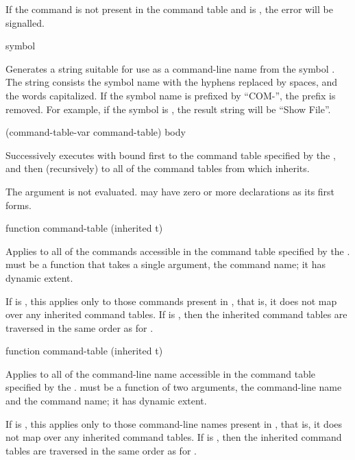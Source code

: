 If the command is not present in the command table and  is
, the  error will be signalled.

 {symbol}

Generates a string suitable for use as a command-line name from the symbol
.  The string consists the symbol name with the hyphens replaced by
spaces, and the words capitalized.  If the symbol name is prefixed by ``COM-'',
the prefix is removed.  For example, if the symbol is , the
result string will be ``Show File''.


  {(command-table-var command-table) \body body}

Successively executes  with  bound first to
the command table specified by the 
, and then (recursively) to all of the command tables from
which  inherits.

The  argument is not evaluated.   may have zero
or more declarations as its first forms.

 {function command-table \key (inherited t)}

Applies  to all of the commands accessible in the command table
specified by the  .
 must be a function that takes a single argument, the command
name; it has dynamic extent.

If  is , this applies  only to
those commands present in , that is, it does not map over
any inherited command tables.  If  is , then the
inherited command tables are traversed in the same order as for
.

 {function command-table \key (inherited t)}

Applies  to all of the command-line name accessible in the
command table specified by the 
.   must be a function of two arguments,
the command-line name and the command name; it has dynamic extent.

If  is , this applies  only to
those command-line names present in , that is, it does
not map over any inherited command tables.  If  is
, then the inherited command tables are traversed in the same
order as for .


